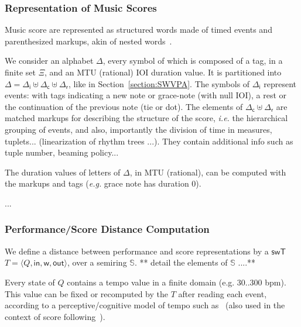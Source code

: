 \documentclass[runningheads]{llncs}
\def\ie{\textit{i.e.}\xspace}
\def\eg{\textit{e.g.}\xspace}
\def\<#1>{\langle #1 \rangle}
\newcommand{\Semiring}{\mathbb{S}}
\def\SWT{\textsf{swT}\xspace}
\def\wei{\mathsf{w}}
\def\init{\mathsf{in}}
\def\final{\mathsf{out}}
\def\Deltai{{\Delta_\mathsf{i}}}
\def\Deltac{{\Delta_\mathsf{c}}}
\def\Deltar{{\Delta_\mathsf{r}}}
\begin{document}
\subsubsection{Representation of Music Scores}
Music score are represented as structured words
made of timed %
events and parenthesized markups,
akin of nested words~\cite{AlurMadhusudan09nested}.

We consider an alphabet $\Delta$, every symbol of which is 
composed of a tag, in a finite set $\Xi$, 
and an MTU (rational) IOI duration value.
It is partitioned into 
$\Delta = \Deltai \uplus \Deltac \uplus \Deltar$, 
like in Section~\ref{section:SWVPA}.
%
\noindent
The symbols of $\Deltai$ represent events:
with tags indicating a new note or grace-note (with null IOI), 
a rest or the continuation of the previous note (tie or dot).
%
The elements of $\Deltac \uplus \Deltar$ are matched
markups for describing the structure of the score, 
\ie the hierarchical grouping of events, and also, 
importantly the division of time in measures, tuplets...
(linearization of rhythm trees \cite{jacquemard:hal-01138642}...).
They contain additional info such as tuple number, beaming policy...

\noindent
The duration values of letters of $\Delta$, in MTU (rational), 
can be computed with the markups and tags (\eg grace note has duration 0).

%

\begin{example}
...      
\end{example}

\subsubsection{Performance/Score Distance Computation}
\label{app:distance}
We define a distance between performance and score representations
by a $\SWT$ $T = \< Q, \init, \wei, \final >$, over a semiring $\Semiring$.
** detail the elements of $\Semiring$ ....**

Every state of $Q$ contains a 
tempo value in a finite domain (e.g. 30..300 bpm).
This value can be fixed 
or recomputed by the $T$ %
after reading each event, 
according to a perceptive/cognitive model of tempo 
such as~\cite{LargeJones99tempo}
(also used in the context of score following~\cite{Cont10TPAMI}).
\end{document}
